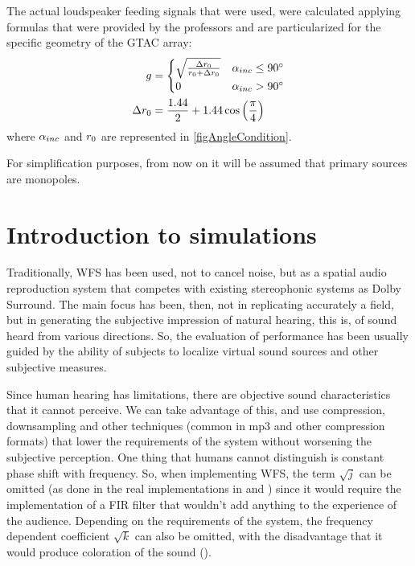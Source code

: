 The actual loudspeaker feeding signals that were used, were calculated applying formulas that were provided by the professors and are particularized for the specific geometry of the GTAC array:
\begin{equation}
\begin{aligned}
g &= 
\begin{cases}
\sqrt{\frac{\Delta {r_0}}{r_0 + \Delta {r_0}}} & \alpha_{inc} \leq 90^\circ \\
0 & \alpha_{inc} > 90^\circ
\end{cases}
\\
\Delta {r_0} &= \frac{1.44}{2} + 1.44 \cos\left( \frac{\pi}{4} \right)
\end{aligned}
\label{amplitFactorGTAC}
\end{equation}
where $\alpha_{inc}$ and $r_0$ are represented in
\autoref{figAngleCondition}.

For simplification purposes, from now on it will be assumed that primary sources are monopoles.

\section{Introduction to simulations}
Traditionally, WFS has been used, not to cancel noise, but as a spatial audio reproduction system that competes with existing stereophonic systems as Dolby Surround. The main focus has been, then, not in replicating accurately a field, but in generating the subjective impression of natural hearing, this is, of sound heard from various directions. So, the evaluation of performance has been usually guided by the ability of subjects to localize virtual sound sources and other subjective measures.

Since human hearing has limitations, there are objective sound characteristics that it cannot perceive. We can take advantage of this, and use compression, downsampling and other techniques (common in mp3 and other compression formats) that lower the requirements of the system without worsening the subjective perception. One thing that humans cannot distinguish is constant phase shift with frequency. So, when implementing WFS, the term $\sqrt{j}$ can be omitted (as done in the real implementations in \cite{Verheijen} and \cite{Vogel}) since it would require the implementation of a FIR filter that wouldn't add anything to the experience of the audience. Depending on the requirements of the system, the frequency dependent coefficient $\sqrt{k}$ can also be omitted, with the disadvantage that it would produce coloration of the sound (\cite{Vogel}).

